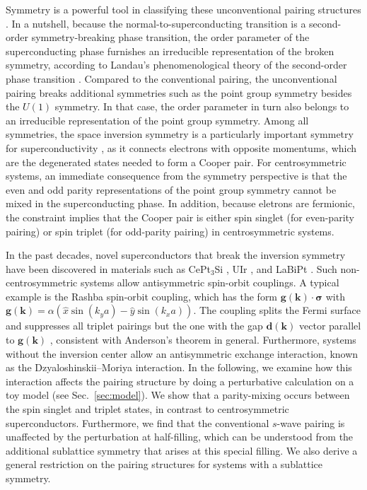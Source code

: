 \documentclass[11pt]{article}
\begin{document}
Symmetry is a powerful tool in classifying these unconventional pairing structures
\cite{Ueda1985, Volovik1985, Manfred_1991}.
In a nutshell, because the normal-to-superconducting transition is a second-order
symmetry-breaking phase transition, the order parameter of the superconducting phase furnishes
an irreducible representation of the broken symmetry, according to Landau's
phenomenological theory of the second-order phase transition \cite{Landau2013}.
Compared to the conventional pairing,
the unconventional pairing breaks additional symmetries such as the point group symmetry
besides the $U(1)$ symmetry. In that case, the order parameter in turn also belongs to
an irreducible representation of the point group symmetry. Among all symmetries,
the space inversion symmetry is a particularly important symmetry for superconductivity \cite{Anderson1984},
as it connects electrons with opposite momentums, which are the degenerated states needed to
form a Cooper pair.
For centrosymmetric systems, an immediate consequence from the symmetry perspective
is that the even and odd parity representations of the point group symmetry cannot be mixed
in the superconducting phase. In addition, because eletrons are fermionic, the constraint
implies that the Cooper pair is either spin singlet (for even-parity pairing) or
spin triplet (for odd-parity pairing) in centrosymmetric systems.

In the past decades, novel superconductors that break the inversion symmetry have been discovered
in materials such as CePt$_3$Si \cite{Bauer2004}, UIr \cite{Akazawa2004}, and
LaBiPt \cite{Goll2008}. Such non-centrosymmetric
systems allow antisymmetric spin-orbit couplings. A typical example is the Rashba spin-orbit coupling,
which has the form $\bm g(\bm k) \cdot \bm \sigma$ with $\bm g(\bm k) = \alpha(\hat{x}\sin(k_y a) -
\hat{y}\sin(k_x a))$. The coupling splits the Fermi surface and suppresses all triplet pairings but
the one with the gap $\bm d(\bm k)$ vector parallel to $\bm g(\bm k)$ \cite{Frigeri2004},
consistent with Anderson's theorem in general. Furthermore, systems without the inversion center allow an
antisymmetric exchange interaction, known as the Dzyaloshinskii–Moriya interaction.
In the following, we examine how this interaction affects the pairing structure
by doing a perturbative calculation on a toy model (see Sec.~\ref{sec:model}).
We show that a parity-mixing occurs between the spin singlet and triplet states,
in contrast to centrosymmetric superconductors. Furthermore, we find that the conventional $s$-wave
pairing is unaffected by the perturbation at half-filling, which can be understood from the additional
sublattice symmetry that arises at this special filling. We also derive a general restriction
on the pairing structures for systems with a sublattice symmetry.
\end{document}
